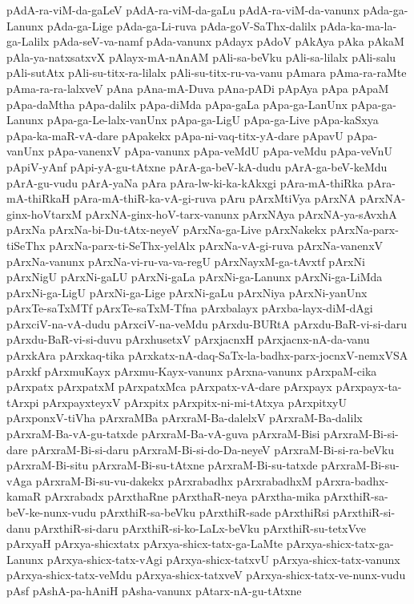 {pAdA-ra-viM-da-gaLeV
pAdA-ra-viM-da-gaLu
pAdA-ra-viM-da-vanunx
pAda-ga-Lanunx
pAda-ga-Lige
pAda-ga-Li-ruva
pAda-goV-SaThx-dalilx
pAda-ka-ma-la-ga-Lalilx
pAda-seV-va-namf
pAda-vanunx
pAdayx
pAdoV
pAkAya
pAka
pAkaM
pAla-ya-natxsatxvX
pAlayx-mA-nAnAM
pAli-sa-beVku
pAli-sa-lilalx
pAli-salu
pAli-sutAtx
pAli-su-titx-ra-lilalx
pAli-su-titx-ru-va-vanu
pAmara
pAma-ra-raMte
pAma-ra-ra-lalxveV
pAna
pAna-mA-Duva
pAna-pADi
pApAya
pApa
pApaM
pApa-daMtha
pApa-dalilx
pApa-diMda
pApa-gaLa
pApa-ga-LanUnx
pApa-ga-Lanunx
pApa-ga-Le-lalx-vanUnx
pApa-ga-LigU
pApa-ga-Live
pApa-kaSxya
pApa-ka-maR-vA-dare
pApakekx
pApa-ni-vaq-titx-yA-dare
pApavU
pApa-vanUnx
pApa-vanenxV
pApa-vanunx
pApa-veMdU
pApa-veMdu
pApa-veVnU
pApiV-yAnf
pApi-yA-gu-tAtxne
pArA-ga-beV-kA-dudu
pArA-ga-beV-keMdu
pArA-gu-vudu
pArA-yaNa
pAra
pAra-lw-ki-ka-kAkxgi
pAra-mA-thiRka
pAra-mA-thiRkaH
pAra-mA-thiR-ka-vA-gi-ruva
pAru
pArxMtiVya
pArxNA
pArxNA-ginx-hoVtarxM
pArxNA-ginx-hoV-tarx-vanunx
pArxNAya
pArxNA-ya-sAvxhA
pArxNa
pArxNa-bi-Du-tAtx-neyeV
pArxNa-ga-Live
pArxNakekx
pArxNa-parx-tiSeThx
pArxNa-parx-ti-SeThx-yelAlx
pArxNa-vA-gi-ruva
pArxNa-vanenxV
pArxNa-vanunx
pArxNa-vi-ru-va-va-regU
pArxNayxM-ga-tAvxtf
pArxNi
pArxNigU
pArxNi-gaLU
pArxNi-gaLa
pArxNi-ga-Lanunx
pArxNi-ga-LiMda
pArxNi-ga-LigU
pArxNi-ga-Lige
pArxNi-gaLu
pArxNiya
pArxNi-yanUnx
pArxTe-saTxMTf
pArxTe-saTxM-Tfna
pArxbalayx
pArxba-layx-diM-dAgi
pArxciV-na-vA-dudu
pArxciV-na-veMdu
pArxdu-BURtA
pArxdu-BaR-vi-si-daru
pArxdu-BaR-vi-si-duvu
pArxhusetxV
pArxjacnxH
pArxjacnx-nA-da-vanu
pArxkAra
pArxkaq-tika
pArxkatx-nA-daq-SaTx-la-badhx-parx-jocnxV-nemxVSA
pArxkf
pArxmuKayx
pArxmu-Kayx-vanunx
pArxna-vanunx
pArxpaM-cika
pArxpatx
pArxpatxM
pArxpatxMca
pArxpatx-vA-dare
pArxpayx
pArxpayx-ta-tArxpi
pArxpayxteyxV
pArxpitx
pArxpitx-ni-mi-tAtxya
pArxpitxyU
pArxponxV-tiVha
pArxraMBa
pArxraM-Ba-dalelxV
pArxraM-Ba-dalilx
pArxraM-Ba-vA-gu-tatxde
pArxraM-Ba-vA-guva
pArxraM-Bisi
pArxraM-Bi-si-dare
pArxraM-Bi-si-daru
pArxraM-Bi-si-do-Da-neyeV
pArxraM-Bi-si-ra-beVku
pArxraM-Bi-situ
pArxraM-Bi-su-tAtxne
pArxraM-Bi-su-tatxde
pArxraM-Bi-su-vAga
pArxraM-Bi-su-vu-dakekx
pArxrabadhx
pArxrabadhxM
pArxra-badhx-kamaR
pArxrabadx
pArxthaRne
pArxthaR-neya
pArxtha-mika
pArxthiR-sa-beV-ke-nunx-vudu
pArxthiR-sa-beVku
pArxthiR-sade
pArxthiRsi
pArxthiR-si-danu
pArxthiR-si-daru
pArxthiR-si-ko-LaLx-beVku
pArxthiR-su-tetxVve
pArxyaH
pArxya-shicxtatx
pArxya-shicx-tatx-ga-LaMte
pArxya-shicx-tatx-ga-Lanunx
pArxya-shicx-tatx-vAgi
pArxya-shicx-tatxvU
pArxya-shicx-tatx-vanunx
pArxya-shicx-tatx-veMdu
pArxya-shicx-tatxveV
pArxya-shicx-tatx-ve-nunx-vudu
pAsf
pAshA-pa-hAniH
pAsha-vanunx
pAtarx-nA-gu-tAtxne
}
